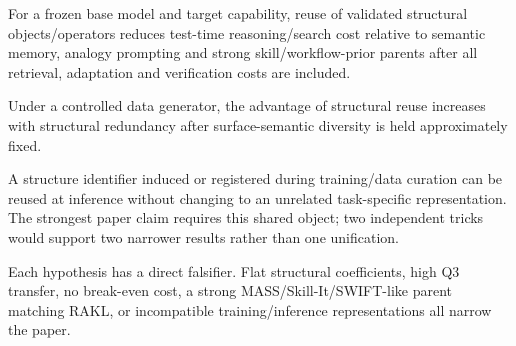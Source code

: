 \begin{hypothesis}
For a frozen base model and target capability, reuse of validated structural objects/operators reduces test-time reasoning/search cost relative to semantic memory, analogy prompting and strong skill/workflow-prior parents after all retrieval, adaptation and verification costs are included.
\end{hypothesis}

\begin{hypothesis}
Under a controlled data generator, the advantage of structural reuse increases with structural redundancy after surface-semantic diversity is held approximately fixed.
\end{hypothesis}

\begin{hypothesis}
A structure identifier induced or registered during training/data curation can be reused at inference without changing to an unrelated task-specific representation. The strongest paper claim requires this shared object; two independent tricks would support two narrower results rather than one unification.
\end{hypothesis}

Each hypothesis has a direct falsifier. Flat structural coefficients, high Q3 transfer, no break-even cost, a strong MASS/Skill-It/SWIFT-like parent matching RAKL, or incompatible training/inference representations all narrow the paper.
